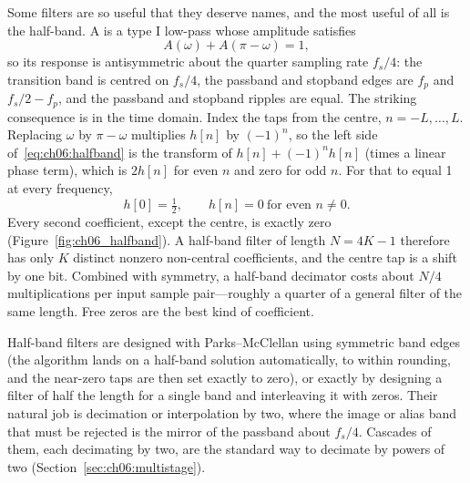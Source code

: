 Some filters are so useful that they deserve names, and the most useful of all is the half-band.
A  is a type I low-pass whose amplitude satisfies
\begin{equation}
A(\omega)+A(\pi-\omega)=1,
\label{eq:ch06:halfband}
\end{equation}
so its response is antisymmetric about the quarter sampling rate $f_s/4$: the transition band is
centred on $f_s/4$, the passband and stopband edges are $f_p$ and $f_s/2-f_p$, and the passband and
stopband ripples are equal. The striking consequence is in the time domain. Index the taps from the
centre, $n=-L,\dots,L$. Replacing $\omega$ by $\pi-\omega$ multiplies $h[n]$ by $(-1)^n$, so the
left side of~\eqref{eq:ch06:halfband} is the transform of $h[n]+(-1)^nh[n]$ (times a linear phase
term), which is $2h[n]$ for even $n$ and zero for odd $n$. For that to equal 1 at every frequency,
\begin{equation}
h[0]=\tfrac12,\qquad h[n]=0\ \text{for even } n\ne0.
\end{equation}
Every second coefficient, except the centre, is exactly zero (Figure~\ref{fig:ch06_halfband}). A
half-band filter of length $N=4K-1$ therefore has only $K$ distinct nonzero non-central
coefficients, and the centre tap is a shift by one bit. Combined with symmetry, a half-band
decimator costs about $N/4$ multiplications per input sample pair---roughly a quarter of a general
filter of the same length. Free zeros are the best kind of coefficient.

Half-band filters are designed with Parks--McClellan using symmetric band edges (the algorithm
lands on a half-band solution automatically, to within rounding, and the near-zero taps are then
set exactly to zero), or exactly by designing a filter of half the length for a single band and
interleaving it with zeros. Their natural job is decimation or interpolation by two, where the
image or alias band that must be rejected is the mirror of the passband about $f_s/4$. Cascades of
them, each decimating by two, are the standard way to decimate by powers of two
(Section~\ref{sec:ch06:multistage}).


